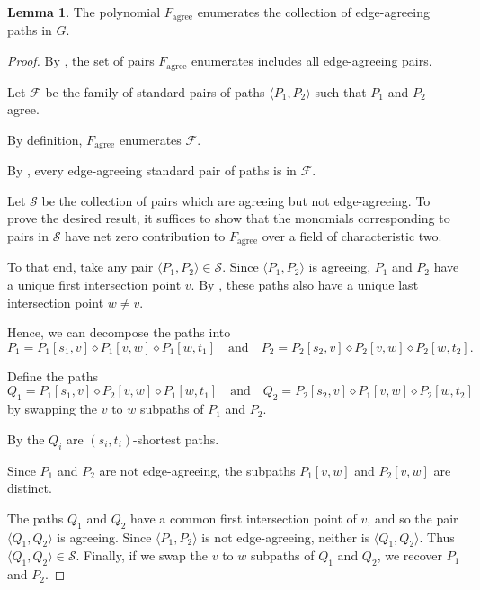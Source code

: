 \documentclass[11pt]{article}
\newcommand{\dia}{\diamond}
\DeclareMathOperator{\dist}{dist}
\newcommand{\ca}{\mathcal}
\newcommand{\agree}{\text{agree}}
\newcommand{\Fagree}{F_{\agree}}
\theoremstyle{definition}
\newtheorem{lemma}[theorem]{Lemma}
\begin{document}
\begin{lemma}
\label{lem:edge-agree}
    The polynomial $\Fagree$ enumerates the collection of edge-agreeing paths in $G$.
\end{lemma}
\begin{proof}
By , the set of pairs $\Fagree$ enumerates includes all edge-agreeing pairs.

    Let $\ca{F}$ be the family of standard pairs of paths $\langle P_1,P_2\rangle$ such that $P_1$ and $P_2$ agree.
    
    By definition, $\Fagree$ enumerates $\ca{F}$.
    
    By , every edge-agreeing standard pair of paths is in $\ca{F}$.

    Let $\ca{S}$ be the collection of pairs which are agreeing but not edge-agreeing.
    To prove the desired result, it suffices to show that the monomials corresponding to pairs in $\ca{S}$ have net zero contribution to $\Fagree$ over a field of characteristic two.

    To that end, take any pair $\langle P_1,P_2\rangle\in \ca{S}$.
    Since $\langle P_1,P_2\rangle$ is agreeing, $P_1$ and $P_2$ have a unique first intersection point $v$.
    By , these paths also have a unique last intersection point $w\neq v$.

    Hence, we can decompose the paths into
    \[P_1 = P_1[s_1,v] \dia P_1[v,w] \dia P_1[w,t_1] \quad \text{and} \quad 
    P_2 = P_2[s_2,v] \dia P_2[v,w] \dia P_2[w,t_2].\]
    
    Define the paths 
        \[Q_1 = P_1[s_1,v] \dia P_2[v,w] \dia P_1[w,t_1] \quad \text{and} \quad 
    Q_2 = P_2[s_2,v] \dia P_1[v,w] \dia P_2[w,t_2]\]
    by swapping the $v$ to $w$ subpaths of $P_1$ and $P_2$.

    By  the $Q_i$ are $(s_i,t_i)$-shortest paths.

    
        Since $P_1$ and $P_2$ are not edge-agreeing, the subpaths $P_1[v,w]$ and $P_2[v,w]$ are distinct.


    The paths $Q_1$ and $Q_2$ have a common first intersection point of $v$, and so the pair $\langle Q_1, Q_2\rangle$ is agreeing.
    Since $\langle P_1,P_2\rangle$ is not edge-agreeing, neither is $\langle Q_1, Q_2\rangle$.
    Thus $\langle Q_1,Q_2\rangle\in \ca{S}$.
    Finally, if we swap the $v$ to $w$ subpaths of $Q_1$ and $Q_2$, we recover $P_1$ and $P_2$.


\end{proof}
\end{document}
